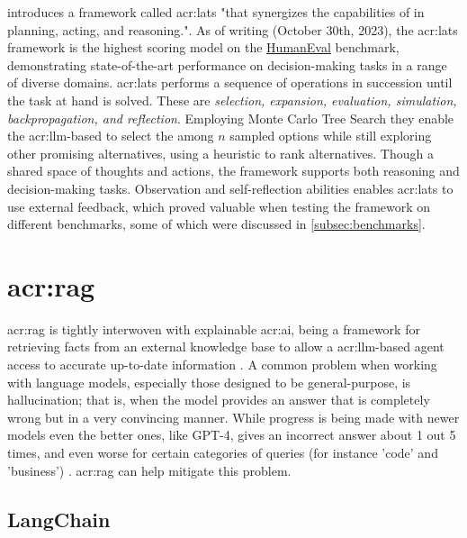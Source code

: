 \cite{zhouLanguageAgentTree2023} introduces a framework called \gls{acr:lats} "that synergizes the capabilities of  in planning, acting, and reasoning.". As of writing (October 30th, 2023), the \gls{acr:lats} framework is the highest scoring model on the \hyperref[subsubsec:humaneval]{HumanEval} benchmark, demonstrating state-of-the-art performance on decision-making tasks in a range of diverse domains. \gls{acr:lats} performs a sequence of operations in succession until the task at hand is solved. These are \textit{selection, expansion, evaluation, simulation, backpropagation, and reflection}. Employing Monte Carlo Tree Search they enable the \acrshort{acr:llm}-based to select the among $n$ sampled options while still exploring other promising alternatives, using a heuristic to rank alternatives. Though a shared space of thoughts and actions, the framework supports both reasoning and decision-making tasks. Observation and self-reflection abilities enables \acrshort{acr:lats} to use external feedback, which proved valuable when testing the framework on different benchmarks, some of which were discussed in \autoref{subsec:benchmarks}.

\section[Retrieval Augmented Generation]{\acrlong{acr:rag}}\label{subsec:retrieval-automented-generation}

\gls{acr:rag} is tightly interwoven with explainable \acrshort{acr:ai}, being a framework for retrieving facts from an external knowledge base to allow a \acrshort{acr:llm}-based agent access to accurate up-to-date information \citep{martineauWhatRetrievalaugmentedGeneration2023}. A common problem when working with language models, especially those designed to be general-purpose, is hallucination; that is, when the model provides an answer that is completely wrong but in a very convincing manner. While progress is being made with newer models even the better ones, like GPT-4, gives an incorrect answer about 1 out 5 times, and even worse for certain categories of queries (for instance 'code' and 'business') \citep[10]{openaiGPT4TechnicalReport2023}. \acrlong{acr:rag} can help mitigate this problem.

\subsection{LangChain}\label{subsubsec:langchain}

